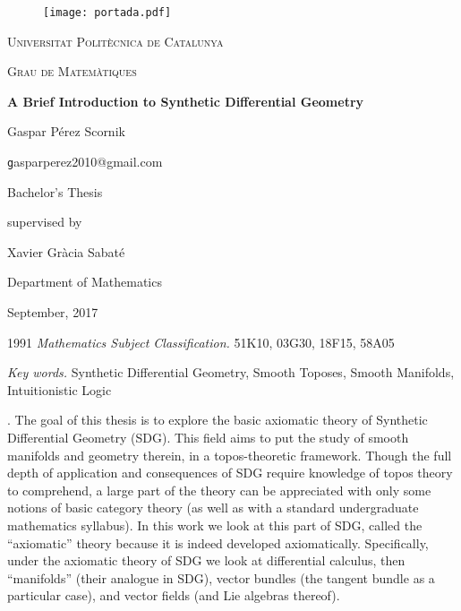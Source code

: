 \documentclass[12pt]{amsbook}
\begin{document}
\begin{figure}
  \begin{center}
    \texttt{[image: portada.pdf]}
  \end{center}
\end{figure}

\begin{titlepage}
	\centering
	{\scshape\LARGE Universitat Polit\`ecnica de Catalunya\par}
	\vspace{1cm}
	{\scshape\Large Grau de Matem\`atiques\par}
	\vspace{1.5cm}
	{\huge\bfseries A Brief Introduction to Synthetic Differential Geometry\par}
	\vspace{2cm}
	{\Large Gaspar P\'erez Scornik\par}
	\vspace{0.3cm}
	{\texttt gasparperez2010@gmail.com\par}
	\vfill
	Bachelor's Thesis\par
	supervised by\par
	\vspace{0.3cm}
	Xavier Gr\`acia Sabat\'e\par
  Department of Mathematics

	\vfill

	{\large September, 2017}
\end{titlepage}

\frontmatter

\setcounter{page}{2}

\begin{center}
  1991 {\itshape Mathematics Subject Classification.} 51K10, 03G30, 18F15, 58A05\par
  \vspace{0.3cm}
  {\itshape Key words.} Synthetic Differential Geometry, Smooth Toposes, Smooth Manifolds, Intuitionistic Logic\par
\end{center}

\vspace{0.5cm}

. The goal of this thesis is to explore the basic axiomatic theory of Synthetic Differential Geometry (SDG). This field aims to put the study of smooth manifolds and geometry therein, in
a topos-theoretic framework. Though the full depth of application and consequences of SDG
require knowledge of topos theory to comprehend, a large part of the theory can be appreciated
with only some notions of basic category theory (as well as with a standard undergraduate
mathematics syllabus). In this work we look at this part of SDG, called the “axiomatic” theory
because it is indeed developed axiomatically. Specifically, under the axiomatic theory of SDG
we look at differential calculus, then “manifolds” (their analogue in SDG), vector bundles (the
tangent bundle as a particular case), and vector fields (and Lie algebras thereof).\par
\vspace{0.2cm}
\end{document}
